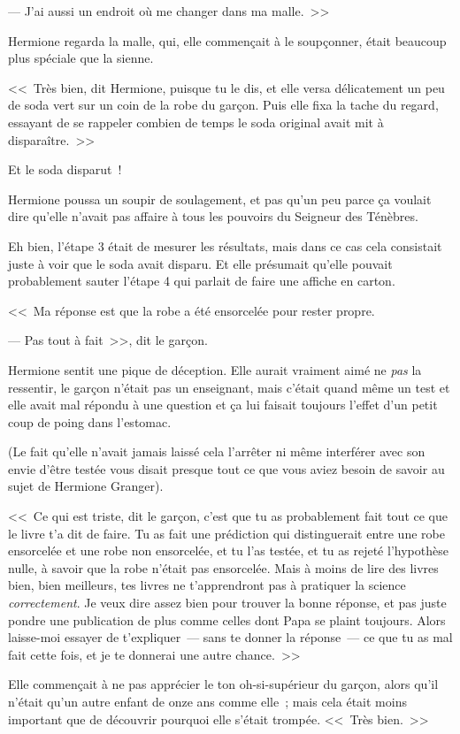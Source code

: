 --- J'ai aussi un endroit où me changer dans ma malle.~>>

Hermione regarda la malle, qui, elle commençait à le soupçonner, était beaucoup plus spéciale que la sienne.

<<~Très bien, dit Hermione, puisque tu le dis, et elle versa délicatement un peu de soda vert sur un coin de la robe du garçon. Puis elle fixa la tache du regard, essayant de se rappeler combien de temps le soda original avait mit à disparaître.~>>

Et le soda disparut~!

Hermione poussa un soupir de soulagement, et pas qu'un peu parce ça voulait dire qu'elle n'avait pas affaire à tous les pouvoirs du Seigneur des Ténèbres.

Eh bien, l'étape 3 était de mesurer les résultats, mais dans ce cas cela consistait juste à voir que le soda avait disparu. Et elle présumait qu'elle pouvait probablement sauter l'étape 4 qui parlait de faire une affiche en carton.

<<~Ma réponse est que la robe a été ensorcelée pour rester propre.

--- Pas tout à fait~>>, dit le garçon.

Hermione sentit une pique de déception. Elle aurait vraiment aimé ne \emph{pas} la ressentir, le garçon n'était pas un enseignant, mais c'était quand même un test et elle avait mal répondu à une question et ça lui faisait toujours l'effet d'un petit coup de poing dans l'estomac.

(Le fait qu'elle n'avait jamais laissé cela l'arrêter ni même interférer avec son envie d'être testée vous disait presque tout ce que vous aviez besoin de savoir au sujet de Hermione Granger).

<<~Ce qui est triste, dit le garçon, c'est que tu as probablement fait tout ce que le livre t'a dit de faire. Tu as fait une prédiction qui distinguerait entre une robe ensorcelée et une robe non ensorcelée, et tu l'as testée, et tu as rejeté l'hypothèse nulle, à savoir que la robe n'était pas ensorcelée. Mais à moins de lire des livres bien, bien meilleurs, tes livres ne t'apprendront pas à pratiquer la science \emph{correctement}. Je veux dire assez bien pour trouver la bonne réponse, et pas juste pondre une publication de plus comme celles dont Papa se plaint toujours. Alors laisse-moi essayer de t'expliquer~— sans te donner la réponse~— ce que tu as mal fait cette fois, et je te donnerai une autre chance.~>>

Elle commençait à ne pas apprécier le ton oh-si-supérieur du garçon, alors qu'il n'était qu'un autre enfant de onze ans comme elle~; mais cela était moins important que de découvrir pourquoi elle s'était trompée. <<~Très bien.~>>

